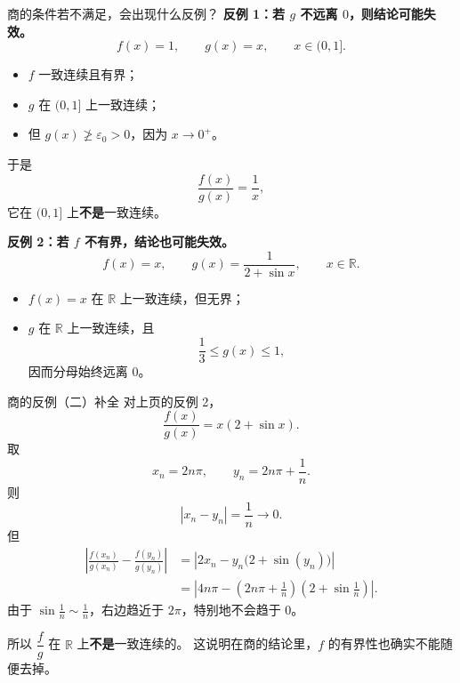 ﻿\documentclass[aspectratio=169,11pt]{ctexbeamer}
\newcommand{\R}{\mathbb{R}}
\begin{document}
\begin{frame}[allowframebreaks]{商的条件若不满足，会出现什么反例？}
\textbf{反例 1：若 $g$ 不远离 $0$，则结论可能失效。}
\[
  f(x)=1,\qquad g(x)=x,\qquad x\in(0,1].
\]
\begin{itemize}
  \item $f$ 一致连续且有界；
  \item $g$ 在 $(0,1]$ 上一致连续；
  \item 但 $g(x)\not\ge \varepsilon_0>0$，因为 $x\to 0^+$。
\end{itemize}
于是
\[
  \frac{f(x)}{g(x)}=\frac1x,
\]
它在 $(0,1]$ 上\textbf{不是}一致连续。
\vspace{0.7em}

\textbf{反例 2：若 $f$ 不有界，结论也可能失效。}
\[
  f(x)=x,\qquad g(x)=\frac{1}{2+\sin x},\qquad x\in\R.
\]
\begin{itemize}
  \item $f(x)=x$ 在 $\R$ 上一致连续，但无界；
  \item $g$ 在 $\R$ 上一致连续，且
  \[
    \frac13\le g(x)\le 1,
  \]
  因而分母始终远离 $0$。
\end{itemize}
\end{frame}

\begin{frame}[allowframebreaks]{商的反例（二）补全}
对上页的反例 2，
\[
  \frac{f(x)}{g(x)}=x(2+\sin x).
\]
取
\[
  x_n=2n\pi,\qquad y_n=2n\pi+\frac1n.
\]
则
\[
  |x_n-y_n|=\frac1n\to 0.
\]
但
\begin{align*}
  \left|\frac{f(x_n)}{g(x_n)}-\frac{f(y_n)}{g(y_n)}\right|
  &=\left|2x_n-y_n\bigl(2+\sin(y_n)\bigr)\right| \\
  &=\left|4n\pi-\left(2n\pi+\frac1n\right)\left(2+\sin\frac1n\right)\right|.
\end{align*}
由于 $\sin\frac1n\sim \frac1n$，右边趋近于 $2\pi$，特别地不会趋于 $0$。
\vspace{0.5em}

所以 $\dfrac{f}{g}$ 在 $\R$ 上\textbf{不是}一致连续的。  
这说明在商的结论里，$f$ 的有界性也确实不能随便去掉。
\end{frame}
\end{document}
